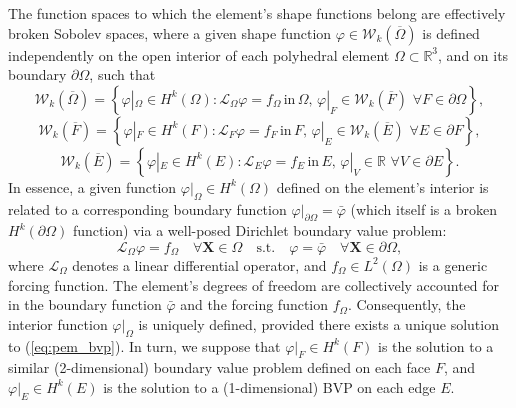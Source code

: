 	The function spaces to which the element's shape functions belong are effectively broken Sobolev spaces, where a given shape function $\varphi \in \mathcal{W}_k (\overline{\Omega})$ is defined independently on the open interior of each polyhedral element $\Omega \subset \mathbb{R}^3$, and on its boundary $\partial \Omega$, such that
	\begin{equation}
		\mathcal{W}_k (\overline{\Omega}) = \left\{ \varphi|_{\Omega} \in H^k (\Omega) : \mathcal{L}_{\Omega} \varphi = f_{\Omega} \, \text{in} \, \Omega, \, \varphi|_{F} \in \mathcal{W}_k (\overline{F}) \, \, \forall F \in \partial \Omega \right\},
	\end{equation}
	\begin{equation}
		\mathcal{W}_k (\overline{F}) = \left\{ \varphi|_{F} \in H^k (F) : \mathcal{L}_{F} \varphi = f_{F} \, \text{in} \, F, \, \varphi|_{E} \in \mathcal{W}_k (\overline{E}) \, \, \forall E \in \partial F \right\},
	\end{equation}
	\begin{equation}
		\mathcal{W}_k (\overline{E}) = \left\{ \varphi|_{E} \in H^k (E) : \mathcal{L}_{E} \varphi = f_{E} \, \text{in} \, E, \, \varphi|_{V} \in \mathbb{R} \, \, \forall V \in \partial E \right\}.
	\end{equation}
	In essence, a given function $\varphi|_{\Omega} \in H^k (\Omega)$ defined on the element's interior is related to a corresponding boundary function $\varphi|_{\partial \Omega} = \bar{\varphi}$ (which itself is a broken $H^k (\partial \Omega)$ function) via a well-posed Dirichlet boundary value problem:
	\begin{equation}
		\mathcal{L}_{\Omega} \varphi = f_{\Omega} \quad \forall \mathbf{X} \in \Omega \quad \text{s.t.} \quad \varphi = \bar{\varphi} \quad \forall \mathbf{X} \in \partial \Omega,
		\label{eq:pem_bvp}
	\end{equation}
	where $\mathcal{L}_{\Omega}$ denotes a linear differential operator, and $f_{\Omega} \in L^2 (\Omega)$ is a generic forcing function. The element's degrees of freedom are collectively accounted for in the boundary function $\bar{\varphi}$ and the forcing function $f_{\Omega}$. Consequently, the interior function $\varphi|_{\Omega}$ is uniquely defined, provided there exists a unique solution to (\ref{eq:pem_bvp}). In turn, we suppose that $\varphi|_{F} \in H^k(F)$ is the solution to a similar (2-dimensional) boundary value problem defined on each face $F$, and $\varphi|_E \in H^k(E)$ is the solution to a (1-dimensional) BVP on each edge $E$.
	
